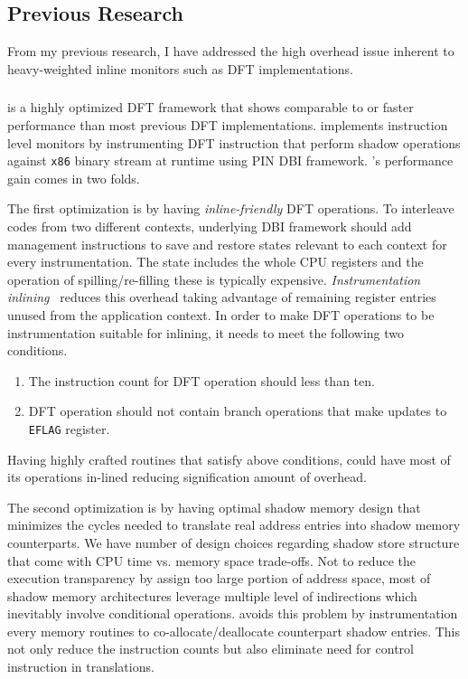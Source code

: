 \subsection{Previous Research}

From my previous research, I have addressed the high overhead issue inherent to
heavy-weighted inline monitors such as DFT implementations.

\subsubsection{\libdft}

\libdft is a highly optimized DFT framework that shows comparable to or faster
performance than most previous DFT implementations. \libdft implements
instruction level monitors by instrumenting DFT instruction that perform shadow
operations against {\tt x86} binary stream at runtime using PIN DBI
framework.
%
\libdft's performance gain comes in two folds. 

The first optimization is by having {\it inline-friendly} DFT operations. To
interleave codes from two different contexts, underlying DBI framework should
add management instructions to save and restore states relevant to each context
for every instrumentation. The state includes the whole CPU registers and the
operation of spilling/re-filling these is typically expensive. {\it
Instrumentation inlining}~\cite{inlining:wbia2006} reduces this overhead taking
advantage of remaining register entries unused from the application context. In
order to make DFT operations to be instrumentation suitable for inlining, it
needs to meet the following two conditions.
%
\begin{enumerate} \item The instruction count for DFT operation should less
than ten.  \item DFT operation should not contain branch operations that make
updates to {\tt EFLAG} register.  \end{enumerate} 
%
Having highly crafted routines that satisfy above conditions, \libdft could
have most of its operations in-lined reducing signification amount of overhead.

The second optimization is by having optimal shadow memory design that
minimizes the cycles needed to translate real address entries into shadow
memory counterparts. We have number of design choices regarding shadow store
structure that come with CPU time vs. memory space trade-offs. Not to reduce
the execution transparency by assign too large portion of address space, most
of shadow memory architectures leverage multiple level of indirections which
inevitably involve conditional operations. \libdft avoids this problem by
instrumentation every memory routines to co-allocate/deallocate counterpart
shadow entries. This not only reduce the instruction counts but also eliminate
need for control instruction in translations.

